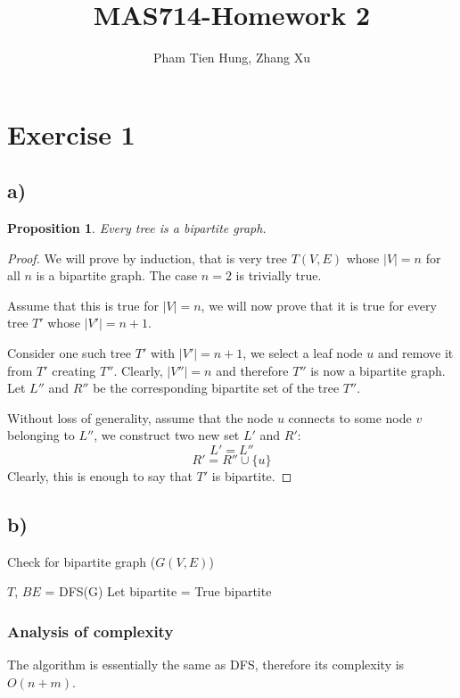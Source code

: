 \documentclass[a4paper,10pt,twoside]{article}
\title{MAS714-Homework 2}
\author{Pham Tien Hung, Zhang Xu
}
\date{}
\newtheorem{proof}{Proof}
\newtheorem{proposition}{Proposition}
\begin{document}
\maketitle
\listoftodos[Notes]

\section*{Exercise 1}
\subsection*{a)}
\begin{proposition}
Every tree is a bipartite graph.
\end{proposition}
\begin{proof}
	We will prove by induction, that is very tree $T(V, E)$ whose
	$|V| = n$ for all $n$ is a bipartite graph. The case $n=2$ is trivially true.

	Assume that this is true for $|V| = n$, we will now prove that it
	is true for every tree $T'$ whose $|V'| = n + 1$. 

	Consider one such tree $T'$ with $|V'| = n + 1$, we select a leaf node $u$
	and remove it from $T'$ creating $T''$. Clearly, $|V''| = n$ and
	therefore $T''$ is now a bipartite graph. Let $L''$ and $R''$ be the
	corresponding bipartite set of the tree $T''$.

	Without loss of generality, assume that the node $u$ connects to
	some node $v$ belonging to $L''$, we construct two new set $L'$
	and $R'$:
	\[
		L' = L''
	\]
	\[
		R' = R'' \cup \{u\}
	\]
	Clearly, this is enough to say that $T'$ is bipartite.	
\end{proof}

\subsection*{b)}
\begin{algorithm}[H]
	\caption{Check for bipartite graph ($G(V, E)$)}
	$T$, $BE$ = DFS(G) 
	Let bipartite = True\;
	\Return bipartite
\end{algorithm}
\subsubsection*{Analysis of complexity}
The algorithm is essentially the same as DFS, therefore its complexity is $O(n + m)$.
\end{document}
